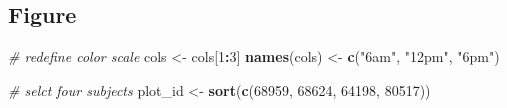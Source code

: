 \documentclass[
]{article}
\newenvironment{Shaded}{\begin{snugshade}}{\end{snugshade}}
\newcommand{\CommentTok}[1]{\textcolor[rgb]{0.56,0.35,0.01}{\textit{#1}}}
\newcommand{\DecValTok}[1]{\textcolor[rgb]{0.00,0.00,0.81}{#1}}
\newcommand{\FunctionTok}[1]{\textcolor[rgb]{0.13,0.29,0.53}{\textbf{#1}}}
\newcommand{\NormalTok}[1]{#1}
\newcommand{\OtherTok}[1]{\textcolor[rgb]{0.56,0.35,0.01}{#1}}
\newcommand{\SpecialCharTok}[1]{\textcolor[rgb]{0.81,0.36,0.00}{\textbf{#1}}}
\newcommand{\StringTok}[1]{\textcolor[rgb]{0.31,0.60,0.02}{#1}}
\begin{document}
\hypertarget{figure-1}{%
\subsection{Figure}\label{figure-1}}

\begin{Shaded}
\begin{Highlighting}[]
\CommentTok{\# redefine color scale}
\NormalTok{cols }\OtherTok{\textless{}{-}}\NormalTok{ cols[}\DecValTok{1}\SpecialCharTok{:}\DecValTok{3}\NormalTok{] }
\FunctionTok{names}\NormalTok{(cols) }\OtherTok{\textless{}{-}} \FunctionTok{c}\NormalTok{(}\StringTok{"6am"}\NormalTok{, }\StringTok{"12pm"}\NormalTok{, }\StringTok{"6pm"}\NormalTok{)}

\CommentTok{\# selct four subjects}
\NormalTok{plot\_id }\OtherTok{\textless{}{-}} \FunctionTok{sort}\NormalTok{(}\FunctionTok{c}\NormalTok{(}\DecValTok{68959}\NormalTok{, }\DecValTok{68624}\NormalTok{, }\DecValTok{64198}\NormalTok{, }\DecValTok{80517}\NormalTok{))}


\end{Highlighting}
\end{Shaded}
\end{document}
